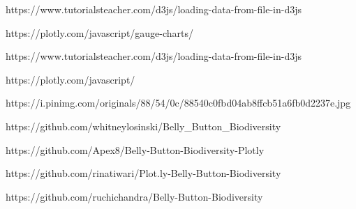 https://www.tutorialsteacher.com/d3js/loading-data-from-file-in-d3js

https://plotly.com/javascript/gauge-charts/

https://www.tutorialsteacher.com/d3js/loading-data-from-file-in-d3js

https://plotly.com/javascript/

https://i.pinimg.com/originals/88/54/0c/88540c0fbd04ab8ffcb51a6fb0d2237e.jpg

https://github.com/whitneylosinski/Belly_Button_Biodiversity

https://github.com/Apex8/Belly-Button-Biodiversity-Plotly

https://github.com/rinatiwari/Plot.ly-Belly-Button-Biodiversity

https://github.com/ruchichandra/Belly-Button-Biodiversity